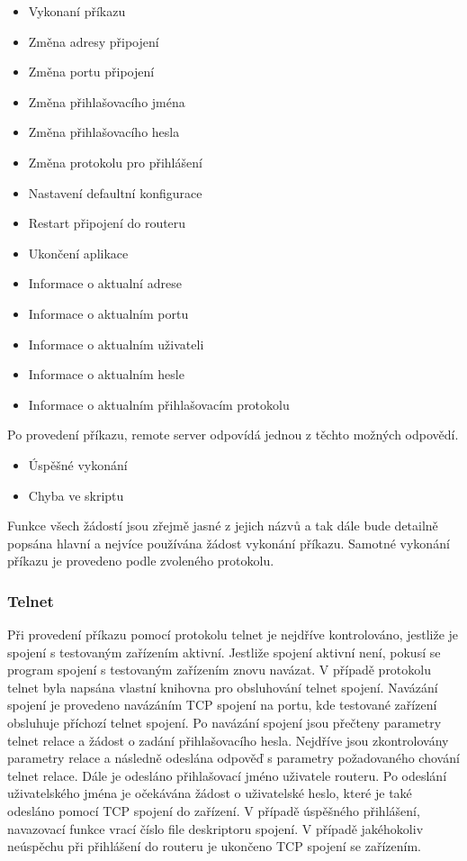 \begin{itemize}
  \item Vykonaní příkazu
  \item Změna adresy připojení
  \item Změna portu připojení
  \item Změna přihlašovacího jména
  \item Změna přihlašovacího hesla
  \item Změna protokolu pro přihlášení
  \item Nastavení defaultní konfigurace
  \item Restart připojení do routeru
  \item Ukončení aplikace
  \item Informace o aktualní adrese
  \item Informace o aktualním portu
  \item Informace o aktualním uživateli
  \item Informace o aktualním hesle
  \item Informace o aktualním přihlašovacím protokolu
\end{itemize}

Po provedení příkazu, remote server odpovídá jednou z těchto možných odpovědí.

\begin{itemize}
  \item Úspěšné vykonání
  \item Chyba ve skriptu
\end{itemize}

Funkce všech žádostí jsou zřejmě jasné z jejich názvů a tak dále bude detailně popsána hlavní a nejvíce používána žádost vykonání příkazu. Samotné vykonání příkazu je provedeno podle zvoleného protokolu.

\subsubsection{Telnet}
Při provedení příkazu pomocí protokolu telnet je nejdříve kontrolováno, jestliže je spojení s testovaným zařízením aktivní. Jestliže spojení aktivní není, pokusí se program spojení s testovaným zařízením znovu navázat. V případě protokolu telnet byla napsána vlastní knihovna pro obsluhování telnet spojení. Navázání spojení je provedeno navázáním TCP spojení na portu, kde testované zařízení obsluhuje příchozí telnet spojení. Po navázání spojení jsou přečteny parametry telnet relace a žádost o zadání přihlašovacího hesla. Nejdříve jsou zkontrolovány parametry relace a následně odeslána odpověď s parametry požadovaného chování telnet relace. Dále je odesláno přihlašovací jméno uživatele routeru. Po odeslání uživatelského jména je očekávána žádost o uživatelské heslo, které je také odesláno pomocí TCP spojení do zařízení. V případě úspěšného přihlášení, navazovací funkce vrací číslo file deskriptoru spojení. V případě jakéhokoliv neúspěchu při přihlášení do routeru je ukončeno TCP spojení se zařízením.


